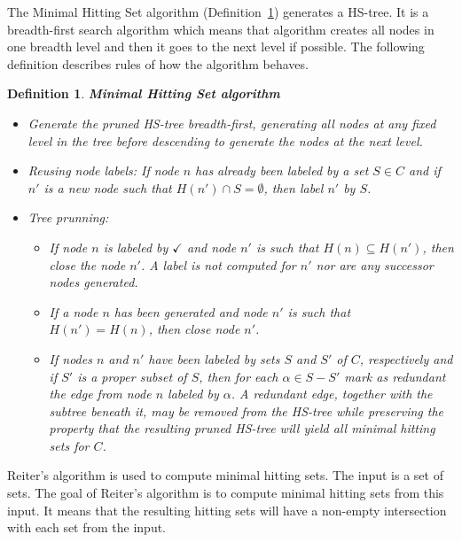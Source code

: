 \documentclass[12pt,a4paper]{article}
\newtheorem{definition}{Definition}[subsection]
\begin{document}
The Minimal Hitting Set algorithm (Definition~\ref{def:mhs}) generates a HS-tree. It is a breadth-first search algorithm which means that algorithm creates all nodes in one breadth level and then it goes to the next level if possible. The following definition describes rules of how the algorithm behaves.

\begin{definition}{\textbf{Minimal Hitting Set algorithm}}{\indent}
	\label{def:mhs}
	\begin{itemize}
		\item Generate the pruned HS-tree breadth-first, generating all nodes at any fixed level in the tree before descending to generate the nodes at the next level.
		
		\item Reusing node labels: If node $n$ has already been labeled by a set $S \in C$ and if $n'$ is a new node such that $H(n') \cap S = \emptyset$, then label $n'$ by $S$.
		
		\item Tree prunning:
		
		\begin{itemize}
			\item If node $n$ is labeled by $\checkmark$ and node $n'$ is such that $H(n) \subseteq H(n')$, then close the node $n'$. A label is not computed for $n'$ nor are any successor nodes generated.
			
			\item If a node $n$ has been generated and node $n'$ is such that $H(n') = H(n)$, then close node $n'$.
			
			\item If nodes $n$ and $n'$ have been labeled by sets $S$ and $S'$ of $C$, respectively and if $S'$ is a proper subset of $S$, then for each $\alpha \in S - S'$ mark as redundant the edge from node $n$ labeled by $\alpha$. A redundant edge, together with the subtree beneath it, may be removed from the HS-tree while preserving the property that the resulting pruned HS-tree will yield all minimal hitting sets for $C$.
			
		\end{itemize}	
		
	\end{itemize}
	
\end{definition}

Reiter's algorithm is used to compute minimal hitting sets. The input is a set of sets. The goal of Reiter's algorithm is to compute minimal hitting sets from this input. It means that the resulting hitting sets will have a non-empty intersection with each set from the input.
\end{document}
